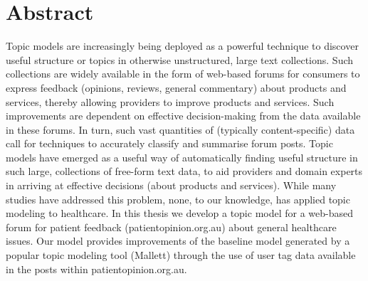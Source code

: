 \documentclass[11pt,twoside]{report}
\begin{document}
\tableofcontents
\listoffigures
\listoftables

\chapter*{Abstract}
Topic models are increasingly being deployed as a powerful technique to discover useful structure or topics in otherwise unstructured, large text collections. Such collections are widely available in the form of web-based forums for consumers to express feedback (opinions, reviews, general commentary) about products and services, thereby allowing providers to improve products and services. Such improvements are dependent on effective decision-making from the data available in these forums. In turn, such vast quantities of (typically content-specific) data call for techniques to accurately classify and summarise forum posts. Topic models have emerged as a useful way of automatically finding useful structure in such large, collections of free-form text data, to aid providers and domain experts in arriving at effective decisions (about products and services). While many studies have addressed this problem, none, to our knowledge, has applied topic modeling to healthcare. In this thesis we develop a topic model for a web-based forum for patient feedback (patientopinion.org.au) about general healthcare issues. Our model provides improvements of the baseline model generated by a popular topic modeling tool (Mallett) through the use of user tag data available in the posts within patientopinion.org.au.  

\end{document}
